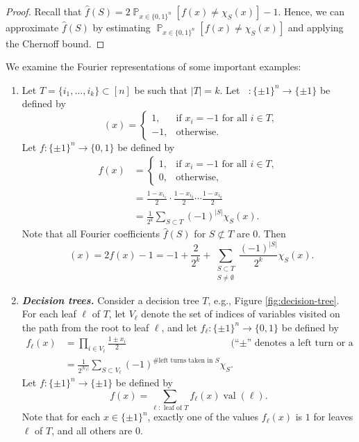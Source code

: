 \documentclass[letterpaper, reqno,11pt]{article}
\newcommand{\PP}{\mathop{{}\mathbb{P}}}
\DeclareMathOperator{\ANDbar}{\mathsf{\overline{AND}}}
\DeclareMathOperator{\val}{val}
\begin{document}
\begin{proof}
  Recall that $\hat{f}(S) = 2\PP_{x \in \{ 0, 1 \}^n}[f(x) \neq \chi_S(x)] - 1$. Hence, we can approximate $\hat{f}(S)$ by estimating $\PP_{x \in \{ 0, 1 \}^n}[f(x) \neq \chi_S(x)]$ and applying the Chernoff bound.
\end{proof}

We examine the Fourier representations of some important examples:
\begin{enumerate}[label=(\roman*)]
  \item Let $T = \{ i_1, \ldots, i_k \} \subset [n]$ be such that $|T| = k$. Let $\ANDbar : \{ \pm 1 \}^n \to \{ \pm 1 \}$ be defined by
  $$ \ANDbar(x) = \left\{
    \begin{array}{ll}
      1, & \text{if $x_i = -1$ for all $i \in T$}, \\
      -1, & \text{otherwise}.
    \end{array}
  \right. $$
  Let $f : \{ \pm 1 \}^n \to \{ 0, 1 \}$ be defined by
  \begin{align*}
    f(x) &= \left\{
      \begin{array}{ll}
        1, & \text{if $x_i = -1$ for all $i \in T$}, \\
        0, & \text{otherwise},
      \end{array}
    \right. \\
    &= \frac{1 - x_{i_1}}{2} \cdot \frac{1 - x_{i_2}}{2} \cdots \frac{1 - x_{i_k}}{2} \\
    &= \frac{1}{2^k} \sum_{S \subset T} (-1)^{|S|} \chi_S(x).
  \end{align*}
  Note that all Fourier coefficients $\hat{f}(S)$ for $S \not \subset T$ are $0$. Then
  $$ \ANDbar(x) = 2f(x) - 1 = -1 + \frac{2}{2^k} + \sum_{\substack{S \subset T \\ S \neq \emptyset}} \frac{(-1)^{|S|}}{2^k} \chi_S(x). $$
  \item {\bf \em Decision trees.} Consider a decision tree $T$, e.g., Figure \ref{fig:decision-tree}. For each leaf $\ell$ of $T$, let $V_\ell$ denote the set of indices of variables visited on the path from the root to leaf $\ell$, and let $f_\ell : \{ \pm 1 \}^n \to \{ 0, 1 \}$ be defined by
  \begin{align*}
    f_\ell(x) &= \prod_{i \in V_\ell} \frac{1 \pm x_i}{2} && \text{(``$\pm$'' denotes a left turn or a right turn)} \\
    &= \frac{1}{2^{\left|V_\ell\right|}} \sum_{S \subset V_\ell} (-1)^\text{\# left turns taken in $S$} \chi_S.
  \end{align*}
  Let $f : \{ \pm 1 \}^n \to \{ \pm 1 \}$ be defined by
  $$ f(x) = \sum_{\ell: \text{ leaf of $T$}} f_\ell(x) \val(\ell). $$
  Note that for each $x \in \{ \pm 1 \}^n$, exactly one of the values $f_\ell(x)$ is $1$ for leaves $\ell$ of $T$, and all others are $0$.
  

\end{enumerate}
\end{document}
